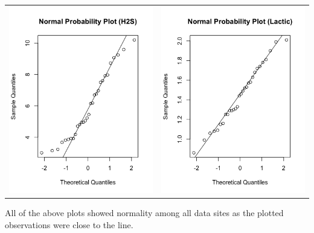 \documentclass[12pt]{article}
\begin{document}
\begin{center}
{\begin{tabular}{cc}
	\includegraphics[width=.5\textwidth, keepaspectratio]{images/1153/normh2s.png} & \includegraphics[width=.5\textwidth, keepaspectratio]{images/1153/normlactic.png}\\
	\end{tabular}}
	\end{center}\par
	All of the above plots showed normality among all data sites as the plotted observations were close to the line.\par
	
\newpage
\end{document}
